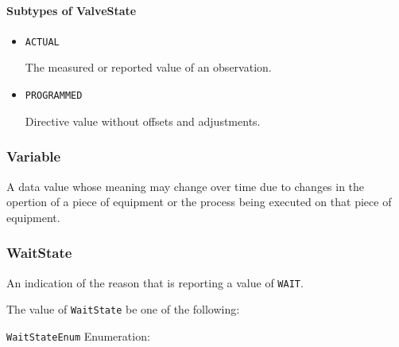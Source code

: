 \paragraph{Subtypes of ValveState}\mbox{}
\label{sec:Subtypes of ValveState}

\begin{itemize}

\item \texttt{ACTUAL}


The measured or reported value of an \gls{observation}.

\item \texttt{PROGRAMMED}


Directive value without offsets and adjustments.




\end{itemize}





\subsubsection{Variable}
\label{sec:Variable}



A data value whose meaning may change over time due to changes in the opertion of a piece of equipment or the process being executed on that piece of equipment.



\subsubsection{WaitState}
\label{sec:WaitState}



An indication of the reason that  is reporting a value of \texttt{WAIT}.


The value of \texttt{WaitState} \MUST be one of the following: 


\texttt{WaitStateEnum} Enumeration:

